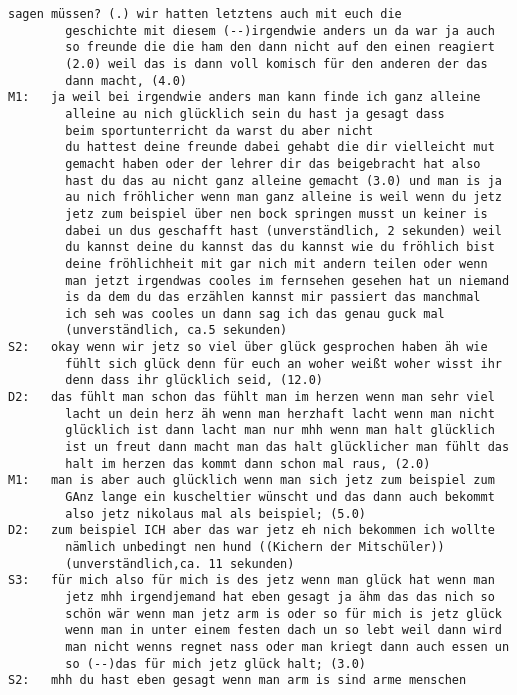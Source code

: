 \begin{lstlisting}[language={}]
        sagen müssen? (.) wir hatten letztens auch mit euch die  
        geschichte mit diesem (--)irgendwie anders un da war ja auch 
        so freunde die die ham den dann nicht auf den einen reagiert  
        (2.0) weil das is dann voll komisch für den anderen der das 
        dann macht, (4.0)
M1:   ja weil bei irgendwie anders man kann finde ich ganz alleine 
        alleine au nich glücklich sein du hast ja gesagt dass
        beim sportunterricht da warst du aber nicht
        du hattest deine freunde dabei gehabt die dir vielleicht mut 
        gemacht haben oder der lehrer dir das beigebracht hat also 
        hast du das au nicht ganz alleine gemacht (3.0) und man is ja 
        au nich fröhlicher wenn man ganz alleine is weil wenn du jetz 
        jetz zum beispiel über nen bock springen musst un keiner is 
        dabei un dus geschafft hast (unverständlich, 2 sekunden) weil 
        du kannst deine du kannst das du kannst wie du fröhlich bist 
        deine fröhlichheit mit gar nich mit andern teilen oder wenn 
        man jetzt irgendwas cooles im fernsehen gesehen hat un niemand 
        is da dem du das erzählen kannst mir passiert das manchmal 
        ich seh was cooles un dann sag ich das genau guck mal  
        (unverständlich, ca.5 sekunden)
S2:   okay wenn wir jetz so viel über glück gesprochen haben äh wie  
        fühlt sich glück denn für euch an woher weißt woher wisst ihr 
        denn dass ihr glücklich seid, (12.0)
D2:   das fühlt man schon das fühlt man im herzen wenn man sehr viel 
        lacht un dein herz äh wenn man herzhaft lacht wenn man nicht 
        glücklich ist dann lacht man nur mhh wenn man halt glücklich 
        ist un freut dann macht man das halt glücklicher man fühlt das 
        halt im herzen das kommt dann schon mal raus, (2.0)
M1:   man is aber auch glücklich wenn man sich jetz zum beispiel zum 
        GAnz lange ein kuscheltier wünscht und das dann auch bekommt 
        also jetz nikolaus mal als beispiel; (5.0)
D2:   zum beispiel ICH aber das war jetz eh nich bekommen ich wollte  
        nämlich unbedingt nen hund ((Kichern der Mitschüler)) 
        (unverständlich,ca. 11 sekunden)
S3:   für mich also für mich is des jetz wenn man glück hat wenn man  
        jetz mhh irgendjemand hat eben gesagt ja ähm das das nich so 
        schön wär wenn man jetz arm is oder so für mich is jetz glück 
        wenn man in unter einem festen dach un so lebt weil dann wird 
        man nicht wenns regnet nass oder man kriegt dann auch essen un 
        so (--)das für mich jetz glück halt; (3.0)
S2:   mhh du hast eben gesagt wenn man arm is sind arme menschen 

\end{lstlisting}
